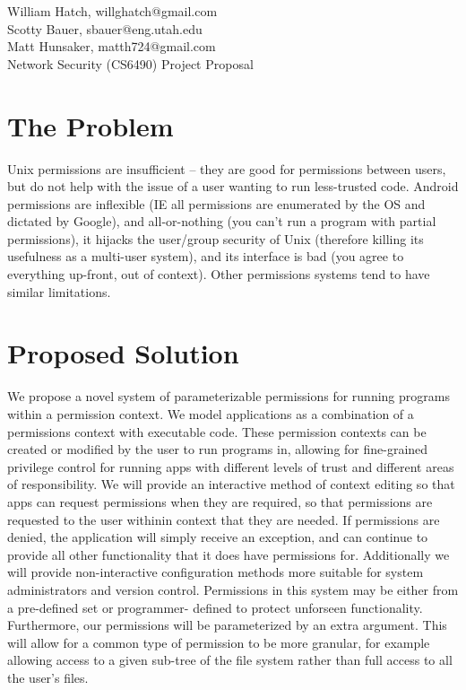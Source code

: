 \documentclass[12pt,letterpaper]{article}
\begin{document}
\noindent
William Hatch, willghatch@gmail.com \\
\noindent
Scotty Bauer, sbauer@eng.utah.edu \\
\noindent
Matt Hunsaker, matth724@gmail.com \\
\noindent
Network Security (CS6490) Project Proposal \\

\section*{The Problem}

Unix permissions are insufficient -- they are good for permissions between
users, but do not help with the issue of a user wanting to run less-trusted
code.  Android permissions are inflexible (IE all permissions are enumerated by
the OS and dictated by Google), and all-or-nothing (you can't run a program
with partial permissions), it hijacks the user/group security of Unix
(therefore killing its usefulness as a multi-user system), and its interface is
bad (you agree to everything up-front, out of context).  Other permissions
systems tend to have similar limitations.

\section*{Proposed Solution}

We propose a novel system of parameterizable permissions for running programs
within a permission context.  We model applications as a combination of a
permissions context with executable code.  These permission contexts can be
created or modified by the user to run programs in, allowing for fine-grained
privilege control for running apps with different levels of trust and different
areas of responsibility.  We will provide an interactive method of context
editing so that apps can request permissions when they are required, so that
permissions are requested to the user withinin context that they are needed.
If permissions are denied, the application will simply receive an exception,
and can continue to provide all other functionality that it does have
permissions for.  Additionally we will provide non-interactive configuration
methods more suitable for system administrators and version control.
Permissions in this system may be either from a pre-defined set or programmer-
defined to protect unforseen functionality.  Furthermore, our permissions will
be parameterized by an extra argument.  This will allow for a common type of
permission to be more granular, for example allowing access to a given sub-tree
of the file system rather than full access to all the user's files.
\end{document}
